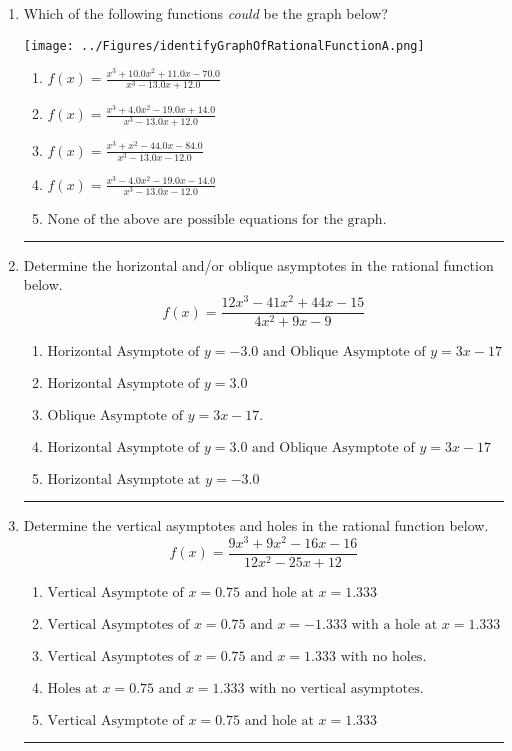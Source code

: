 \documentclass[14pt]{extbook}
\newcommand{\litem}[1]{\item#1\hspace*{-1cm}\rule{\textwidth}{0.4pt}}
\begin{document}
\begin{enumerate}
\litem{
Which of the following functions \textit{could} be the graph below?
\begin{center}
    \texttt{[image: ../Figures/identifyGraphOfRationalFunctionA.png]}
\end{center}
\begin{enumerate}[label=\Alph*.]
\item \( f(x)=\frac{x^{3} +10.0 x^{2} +11.0 x -70.0}{x^{3} -13.0 x + 12.0} \)
\item \( f(x)=\frac{x^{3} +4.0 x^{2} -19.0 x + 14.0}{x^{3} -13.0 x + 12.0} \)
\item \( f(x)=\frac{x^{3} + x^{2} -44.0 x -84.0}{x^{3} -13.0 x -12.0} \)
\item \( f(x)=\frac{x^{3} -4.0 x^{2} -19.0 x -14.0}{x^{3} -13.0 x -12.0} \)
\item \( \text{None of the above are possible equations for the graph.} \)

\end{enumerate} }
\litem{
Determine the horizontal and/or oblique asymptotes in the rational function below.\[ f(x) = \frac{12x^{3} -41 x^{2} +44 x -15}{4x^{2} +9 x -9} \]\begin{enumerate}[label=\Alph*.]
\item \( \text{Horizontal Asymptote of } y = -3.0 \text{ and Oblique Asymptote of } y = 3x -17 \)
\item \( \text{Horizontal Asymptote of } y = 3.0  \)
\item \( \text{Oblique Asymptote of } y = 3x -17. \)
\item \( \text{Horizontal Asymptote of } y = 3.0 \text{ and Oblique Asymptote of } y = 3x -17 \)
\item \( \text{Horizontal Asymptote at } y = -3.0 \)

\end{enumerate} }
\litem{
Determine the vertical asymptotes and holes in the rational function below.\[ f(x) = \frac{9x^{3} +9 x^{2} -16 x -16}{12x^{2} -25 x + 12} \]\begin{enumerate}[label=\Alph*.]
\item \( \text{Vertical Asymptote of } x = 0.75 \text{ and hole at } x = 1.333 \)
\item \( \text{Vertical Asymptotes of } x = 0.75 \text{ and } x = -1.333 \text{ with a hole at } x = 1.333 \)
\item \( \text{Vertical Asymptotes of } x = 0.75 \text{ and } x = 1.333 \text{ with no holes.} \)
\item \( \text{Holes at } x = 0.75 \text{ and } x = 1.333 \text{ with no vertical asymptotes.} \)
\item \( \text{Vertical Asymptote of } x = 0.75 \text{ and hole at } x = 1.333 \)


\end{enumerate}}
\end{enumerate}
\end{document}
